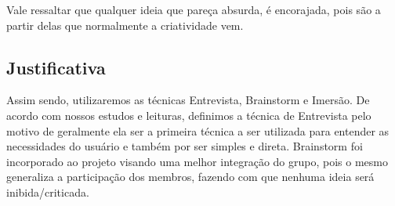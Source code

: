   Vale ressaltar que qualquer ideia que pareça absurda, é encorajada, pois são a partir delas que normalmente a criatividade vem.

\subsection{Justificativa}

  Assim sendo, utilizaremos as técnicas Entrevista, Brainstorm e Imersão. De acordo com nossos estudos e leituras, definimos a técnica de
  Entrevista pelo motivo de geralmente ela ser a primeira técnica a ser utilizada para entender as necessidades do usuário e também por
  ser simples e direta. Brainstorm foi incorporado ao projeto visando uma melhor integração do grupo, pois o mesmo generaliza a
  participação dos membros, fazendo com que nenhuma ideia será inibida/criticada.

